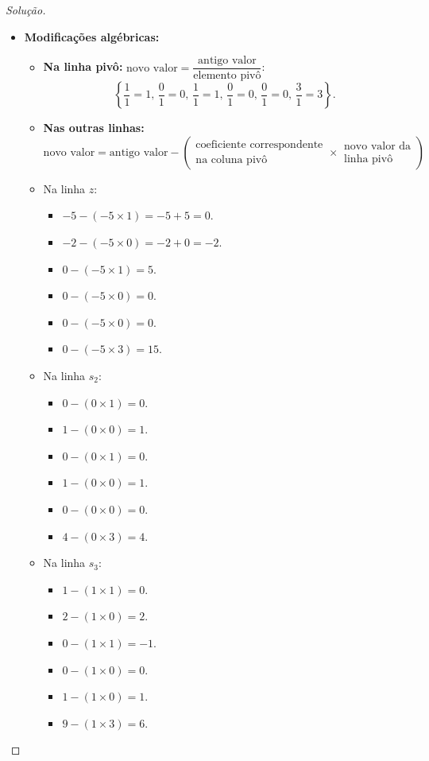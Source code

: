 \documentclass[
	12pt,				%
	openright,			%
	twoside,			%
	a4paper,			%
	english,			%
	french,				%
	brazil,				%
	sumario=tradicional
]{abntex2}
\newenvironment{solution}{
	\begin{proof}[Solução]
}{\end{proof}}
\numberwithin{example}{chapter}
\numberwithin{remark}{chapter}
\numberwithin{definition}{chapter}
\numberwithin{figure}{chapter}
\begin{document}
\begin{solution}
\begin{itemize}
		\item \textbf{Modificações algébricas:}
		
		\begin{itemize}
			\item \textbf{Na linha pivô:} $\text{novo valor}=\dfrac{\text{antigo valor}}{\text{elemento pivô}}$:
			$$
			    \left \{
			        \dfrac{1}{1}=1\text{, }
			        \dfrac{0}{1}=0\text{, }
			        \dfrac{1}{1}=1\text{, }
			        \dfrac{0}{1}=0\text{, }
			        \dfrac{0}{1}=0\text{, }
			        \dfrac{3}{1}=3
			    \right \}\text{.}
			$$
			
			\item \textbf{Nas outras linhas:}
			$$
			    \text{novo valor} =\text{antigo valor} - \left (
			        \substack{\text{coeficiente correspondente}\\\text{na coluna pivô}}
			        \times
			        \substack{\text{novo valor da}\\\text{linha pivô}}
			    \right )
			$$
			
			\item Na linha $z$:
			\begin{itemize}
				\item $-5-(-5\times 1)=-5+5=0$.
				\item $-2-(-5\times 0)=-2+0=-2$.
				\item $0-(-5\times 1)=5$.
				\item $0-(-5\times 0)=0$.
				\item $0-(-5\times 0)=0$.
				\item $0-(-5\times 3)=15$.
			\end{itemize}
			
			\item Na linha $s_2$:
			\begin{itemize}
				\item $0-(0\times 1)=0$.
				\item $1-(0\times 0)=1$.
				\item $0-(0\times 1)=0$.
				\item $1-(0\times 0)=1$.
				\item $0-(0\times 0)=0$.
				\item $4-(0\times 3)=4$.
			\end{itemize}
			
			\item Na linha $s_3$:
			\begin{itemize}
				\item $1-(1\times 1)=0$.
				\item $2-(1\times 0)=2$.
				\item $0-(1\times 1)=-1$.
				\item $0-(1\times 0)=0$.
				\item $1-(1\times 0)=1$.
				\item $9-(1\times 3)=6$.
			\end{itemize}
		\end{itemize}
	\end{itemize}
	

\end{solution}
\end{document}
